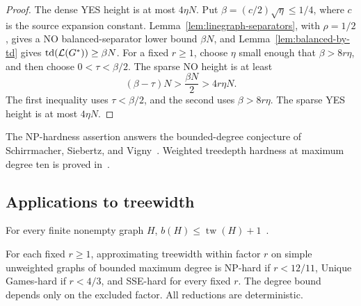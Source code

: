 \begin{proof}
The dense YES height is at most $4\eta N$. Put
$\beta=(c/2)\sqrt\eta\le1/4$, where $c$ is the source expansion
constant. Lemma~\ref{lem:linegraph-separators}, with $\rho=1/2$,
gives a NO balanced-separator lower bound $\beta N$, and
Lemma~\ref{lem:balanced-by-td} gives $\operatorname{td}(\mathcal L(G^*))\ge\beta N$.
For a fixed $r\ge1$, choose $\eta$ small enough that
$\beta>8r\eta$, and then choose $0<\tau<\beta/2$.
The sparse NO height is at least
\[
 (\beta-\tau)N>\frac{\beta N}{2}>4r\eta N.
\]
The first inequality uses $\tau<\beta/2$, and the second uses
$\beta>8r\eta$. The sparse YES height is at most $4\eta N$.

\end{proof}

The \textup{NP}-hardness assertion answers the bounded-degree conjecture of
Schirrmacher, Siebertz, and
Vigny~\cite[Conjecture~1]{SchirrmacherSiebertzVigny2025}.
Weighted treedepth hardness at maximum degree ten is proved
in~\cite{DirksEtAl2025Weighted}.

\subsection{Applications to treewidth}

\begin{lemma}
\label{lem:balanced-by-tw}
For every finite nonempty graph $H$,
$b(H)\leq\operatorname{tw}(H)+1$~\cite[Lemma~5.3]{APW}.
\end{lemma}

\begin{corollary}
\label{cor:tw-bounded-degree}
\label{thm:tw-bounded-degree}
\label{thm:tw-ugc-bounded-degree}
\label{thm:tw-sse-bounded-degree}
For each fixed $r\ge1$, approximating treewidth within factor $r$
on simple unweighted graphs of bounded maximum degree is
\textup{NP}-hard if $r<12/11$, Unique Games-hard if $r<4/3$, and
\textup{SSE}-hard for every fixed $r$.
The degree bound depends only on the excluded factor. All reductions
are deterministic.
\end{corollary}

